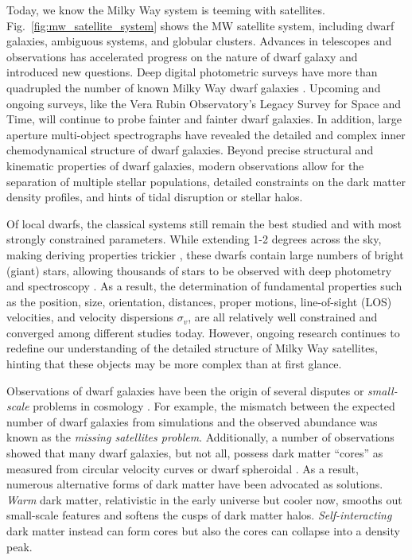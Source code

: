 Today, we know the Milky Way system is teeming with satellites.
Fig.~\ref{fig:mw_satellite_system} shows the MW satellite system,
including dwarf galaxies, ambiguous systems, and globular clusters.
Advances in telescopes and observations has accelerated progress on the
nature of dwarf galaxy and introduced new questions. Deep digital
photometric surveys have more than quadrupled the number of known Milky
Way dwarf galaxies \citep{simon2019}. Upcoming and ongoing surveys, like
the Vera Rubin Observatory's Legacy Survey for Space and Time, will
continue to probe fainter and fainter dwarf galaxies. In addition, large
aperture multi-object spectrographs have revealed the detailed and
complex inner chemodynamical structure of dwarf galaxies. Beyond precise
structural and kinematic properties of dwarf galaxies, modern
observations allow for the separation of multiple stellar populations,
detailed constraints on the dark matter density profiles, and hints of
tidal disruption or stellar halos.

Of local dwarfs, the classical systems still remain the best studied and
with most strongly constrained parameters. While extending 1-2 degrees
across the sky, making deriving properties trickier
\citep[e.g.,][]{mateo1998}, these dwarfs contain large numbers of bright
(giant) stars, allowing thousands of stars to be observed with deep
photometry and spectroscopy \citep[e.g.,][]{tolstoy+2023, pace+2020}. As
a result, the determination of fundamental properties such as the
position, size, orientation, distances, proper motions, line-of-sight
(LOS) velocities, and velocity dispersions \(\sigma_v\), are all
relatively well constrained and converged among different studies today.
However, ongoing research continues to redefine our understanding of the
detailed structure of Milky Way satellites, hinting that these objects
may be more complex than at first glance.

Observations of dwarf galaxies have been the origin of several disputes
or \emph{small-scale} problems in cosmology \citep[see
review][]{bullock+boylan-kolchin2017}. For example, the mismatch between
the expected number of dwarf galaxies from simulations and the observed
abundance was known as the \emph{missing satellites problem}.
Additionally, a number of observations showed that many dwarf galaxies,
but not all, possess dark matter ``cores'' as measured from circular
velocity curves \citep[e.g.,][]{moore1994, adams+2014, oh+2015} or dwarf
spheroidal \citep[albeit less constraining,
e.g.,][]{walker+penarrubia2011, read+walker+steger2019}. As a result,
numerous alternative forms of dark matter have been advocated as
solutions. \emph{Warm} dark matter, relativistic in the early universe
but cooler now, smooths out small-scale features and softens the cusps
of dark matter halos. \emph{Self-interacting} dark matter instead can
form cores but also the cores can collapse into a density peak.

